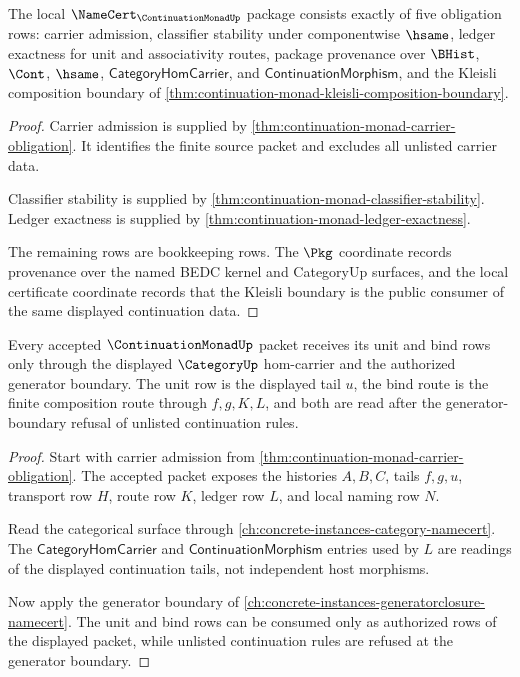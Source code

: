 \begin{theorem}
\label{thm:continuation-monad-namecert-package}
The local $\NameCert_{\ContinuationMonadUp}$ package consists exactly of five obligation rows: carrier admission, classifier stability under componentwise $\hsame$, ledger exactness for unit and associativity routes, package provenance over $\BHist$, $\Cont$, $\hsame$, $\mathsf{CategoryHomCarrier}$, and $\mathsf{ContinuationMorphism}$, and the Kleisli composition boundary of \autoref{thm:continuation-monad-kleisli-composition-boundary}.
\end{theorem}
\begin{proof}
Carrier admission is supplied by \autoref{thm:continuation-monad-carrier-obligation}. It identifies the finite source packet and excludes all unlisted carrier data.

Classifier stability is supplied by \autoref{thm:continuation-monad-classifier-stability}. Ledger exactness is supplied by \autoref{thm:continuation-monad-ledger-exactness}.

The remaining rows are bookkeeping rows. The $\Pkg$ coordinate records provenance over the named BEDC kernel and CategoryUp surfaces, and the local certificate coordinate records that the Kleisli boundary is the public consumer of the same displayed continuation data.
\end{proof}

\begin{theorem}
\label{thm:continuation-monad-root-generator-obligation}
Every accepted $\ContinuationMonadUp$ packet receives its unit and bind rows only through the displayed $\CategoryUp$ hom-carrier and the authorized generator boundary. The unit row is the displayed tail $u$, the bind route is the finite composition route through $f,g,K,L$, and both are read after the generator-boundary refusal of unlisted continuation rules.
\end{theorem}
\begin{proof}
Start with carrier admission from \autoref{thm:continuation-monad-carrier-obligation}. The accepted packet exposes the histories $A,B,C$, tails $f,g,u$, transport row $H$, route row $K$, ledger row $L$, and local naming row $N$.

Read the categorical surface through \autoref{ch:concrete-instances-category-namecert}. The $\mathsf{CategoryHomCarrier}$ and $\mathsf{ContinuationMorphism}$ entries used by $L$ are readings of the displayed continuation tails, not independent host morphisms.

Now apply the generator boundary of \autoref{ch:concrete-instances-generatorclosure-namecert}. The unit and bind rows can be consumed only as authorized rows of the displayed packet, while unlisted continuation rules are refused at the generator boundary.
\end{proof}

